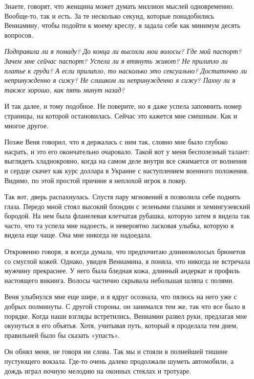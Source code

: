 \documentclass[
]{book}
\begin{document}
Знаете, говорят, что женщина может думать миллион мыслей одновременно. Вообще-то, так и есть. За те несколько секунд, которые понадобились Вениамину, чтобы подойти к моему креслу, я задала себе как минимум десять вопросов.

\emph{Подправила ли я помаду? До конца ли высохли мои волосы? Где мой паспорт? Зачем мне сейчас паспорт? Успела ли я втянуть живот? Не прилипло ли платье к груди? А если прилипло, то насколько это сексуально? Достаточно ли непринужденно я сижу? Не слишком ли непринужденно я сижу? Пахну ли я также хорошо, как пять минут назад?}

И так далее, и тому подобное. Не поверите, но я даже успела запомнить номер страницы, на которой остановилась. Сейчас это кажется мне смешным. Как и многое другое.

Позже Веня говорил, что я держалась с ним так, словно мне было глубоко насрать, и это его окончательно очаровало. Такой вот у меня бесполезный талант: выглядеть хладнокровно, когда на самом деле внутри все сжимается от волнения и сердце скачет как курс доллара в Украине с наступлением военного положения. Видимо, по этой простой причине я неплохой игрок в покер.

Так вот, дверь распахнулась. Спустя пару мгновений я позволила себе поднять глаза. Передо мной стоял высокий блондин с зелеными глазами и хемингуэевский бородой. На нем была фланелевая клетчатая рубашка, которую затем я видела так часто, что та успела мне надоесть, и невероятно ласковая улыбка, которую я видела еще чаще. Она мне никогда не надоедала.

Откровенно говоря, я всегда думала, что предпочитаю длинноволосых брюнетов со смуглой кожей. Однако, увидев Вениамина, я поняла, что никогда не встречала мужчину прекраснее. У него была бледная кожа, длинный андеркат и профиль настоящего викинга. Волосы частично скрывала небольшая шляпа с полями.

Веня улыбнулся мне еще шире, и я вдруг осознала, что пялюсь на него уже с добрых полминуты. С другой стороны, он занимался тем же, так что все было в порядке. Когда наши взгляды встретились, Вениамин развел руки, предлагая мне окунуться в его объятья. Хотя, учитывая путь, который я проделала тем днем, правильней было бы сказать «упасть».

Он обнял меня, не говоря ни слова. Так мы и стояли в полнейшей тишине пустующего вокзала. Где-то очень далеко продолжали шуметь автомобили, а дождь играл ночную мелодию на оконных стеклах и тротуаре.

\hypertarget{chapter-9}{%
\chapter{~}\label{chapter-9}}
\end{document}
